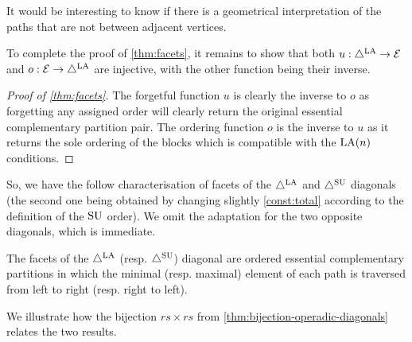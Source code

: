 \begin{remark}
    It would be interesting to know if there is a geometrical interpretation of the paths that are not between adjacent vertices. 
\end{remark}

To complete the proof of \cref{thm:facets}, it remains to show that both $u:\triangle^{\mathrm{LA}} \to \mathcal{E}$ and $o:\mathcal{E}\to \triangle^{\mathrm{LA}}$ are injective, with the other function being their inverse.

\begin{proof}[{Proof of \cref{thm:facets}}]
The forgetful function $u$ is clearly the inverse to $o$ as forgetting any assigned order will clearly return the original essential complementary partition pair. 
The ordering function $o$ is the inverse to $u$ as it returns the sole ordering of the blocks which is compatible with the $\mathrm{LA}(n)$ conditions.
\end{proof}

So, we have the follow characterisation of facets of the $\triangle^{\mathrm{LA}}$ and $\triangle^{\mathrm{SU}}$ diagonals (the second one being obtained by changing slightly \cref{const:total} according to the definition of the $\mathrm{SU}$ order).
We omit the adaptation for the two opposite diagonals, which is immediate.

\begin{corollary} 
\label{prop:LAD-ordered-EC}
The facets of the $\triangle^{\mathrm{LA}}$ (resp. $\triangle^{\mathrm{SU}}$) diagonal are ordered essential complementary partitions in which the minimal (resp. maximal) element of each path is traversed from left to right (resp. right to left).
\end{corollary}

We illustrate how the bijection $rs\times rs$ from \cref{thm:bijection-operadic-diagonals} relates the two results.

